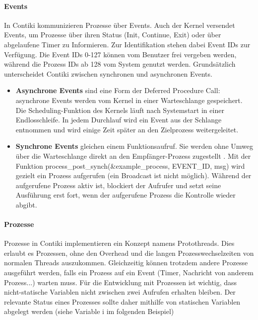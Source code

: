\paragraph{Events}
In Contiki kommunizieren Prozesse \"uber Events. Auch der Kernel versendet Events, um Prozesse \"uber ihren Status 
(Init, Continue, Exit) oder \"uber abgelaufene Timer zu Informieren. Zur Identifikation stehen dabei Event IDs zur 
Verf\"ugung. Die Event IDs 0-127 k\"onnen vom Benutzer frei vergeben werden, w\"ahrend die Prozess IDs ab 128 vom 
System genutzt werden. Grunds\"atzlich unterscheidet Contiki zwischen synchronen und asynchronen Events. 
\begin{itemize}
\item \textbf{Asynchrone Events} sind eine Form der Deferred Procedure Call: asynchrone Events werden vom Kernel in einer 
Warteschlange gespeichert. Die Scheduling-Funktion des Kernels l\"auft nach Systemstart in einer Endlosschleife. 
In jedem Durchlauf wird ein Event aus der Schlange entnommen und wird einige Zeit sp\"ater an den Zielprozess weitergeleitet.
\item \textbf{Synchrone Events} gleichen einem Funktionsaufruf.
Sie werden ohne Umweg \"uber die Warteschlange direkt an den Empf\"anger-Prozess
zugestellt \cite[vgl.][S. 7]{Walter:2010}.  Mit der Funktion process\_post\_synch(\&example\_process, EVENT\_ID, msg) wird gezielt ein 
Prozess aufgerufen (ein Broadcast ist nicht m\"oglich). W\"ahrend der aufgerufene Prozess aktiv ist, blockiert der Aufrufer und 
setzt seine Ausführung erst fort, wenn der aufgerufene Prozess die Kontrolle wieder abgibt.
\end{itemize}

\paragraph{Prozesse}
Prozesse in Contiki implementieren ein Konzept namens Protothreads. Dies erlaubt es Prozessen, ohne den Overhead und die langen 
Prozesswechselzeiten von normalen Threads auszukommen. Gleichzeitig k\"onnen trotzdem andere Prozesse ausgef\"uhrt werden, falls ein Prozess auf ein Event (Timer, Nachricht von anderem Prozess...) warten muss.
F\"ur die Entwicklung mit Prozessen ist wichtig, dass nicht-statische Variablen nicht zwischen zwei Aufrufen erhalten bleiben.
Der relevante Status eines Prozesses sollte daher mithilfe von statischen Variablen abgelegt werden (siehe Variable i im folgenden Beispiel)

